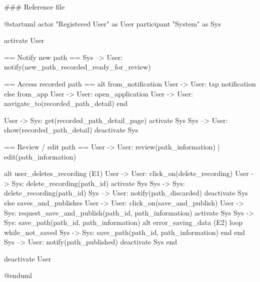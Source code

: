 ### Reference file


@startuml
actor "Registered User" as User
participant "System" as Sys

activate User

== Notify new path ==
Sys --> User: notify(new_path_recorded_ready_for_review)

== Access recorded path ==
alt from_notification
    User -> User: tap notification
else from_app
    User -> User: open_application
    User -> User: navigate_to(recorded_path_detail)
end

User -> Sys: get(recorded_path_detail_page)
activate Sys
Sys --> User: show(recorded_path_detail)
deactivate Sys

== Review / edit path ==
User -> User: review(path_information) | edit(path_information)

alt user_deletes_recording (E1)
    User -> User: click_on(delete_recording)
    User -> Sys: delete_recording(path_id)
    activate Sys
    Sys -> Sys: delete_recording(path_id)
    Sys --> User: notify(path_discarded)
    deactivate Sys
else saves_and_publishes
    User -> User: click_on(save_and_publish)
    User -> Sys: request_save_and_publish(path_id, path_information)
    activate Sys
    Sys -> Sys: save_path(path_id, path_information)
    alt error_saving_data (E2)
        loop while_not_saved
           Sys -> Sys: save_path(path_id, path_information)
        end
    end
    Sys --> User: notify(path_published)
    deactivate Sys
end

deactivate User

@enduml
